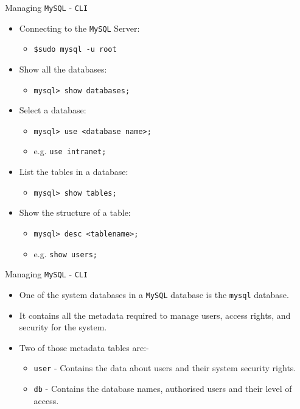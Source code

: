 \documentclass[xcolor=table]{beamer}
\begin{document}
\begin{frame}{Managing \texttt{MySQL} - \texttt{CLI}}
  \begin{itemize}
    \item Connecting to the \texttt{MySQL} Server:
      \begin{itemize}
        \item \texttt{\$sudo mysql -u root}    
      \end{itemize}
    \item Show all the databases:
      \begin{itemize}
        \item \texttt{mysql> show databases;}    
      \end{itemize}
    \item Select a database:
      \begin{itemize}
        \item \texttt{mysql> use <database name>;}
        \item e.g. \texttt{use intranet;}    
      \end{itemize}
    \item List the tables in a database:
      \begin{itemize}
        \item \texttt{mysql> show tables;}
      \end{itemize}
    \item Show the structure of a table: 
      \begin{itemize}
        \item \texttt{mysql> desc <tablename>;}
        \item e.g. \texttt{show users;}    
      \end{itemize}
  \end{itemize}
\end{frame}

\begin{frame}{Managing \texttt{MySQL} - \texttt{CLI}}
  \begin{itemize}
    \item One of the system databases in a \texttt{MySQL} database is the \texttt{mysql} database.
    \item It contains all the metadata required to manage users, access rights, and security for the system.
    \item Two of those metadata tables are:-
      \begin{itemize}
        \item \texttt{user} - Contains the data about users and their system security rights.
        \item \texttt{db} - Contains the database names, authorised users and their level of access.
      \end{itemize}
  \end{itemize}
\end{frame}
\end{document}
